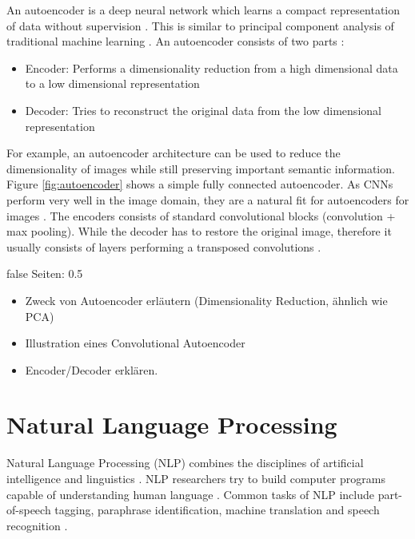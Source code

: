 \documentclass[draft,final,oneside]{vutinfth} %
\begin{document}
An autoencoder is a deep neural network which learns a compact representation of data without supervision \cite{Goodfellow-et-al-2016}. This is similar to principal component analysis of traditional machine learning \cite{bishop}. An autoencoder consists of two parts \cite{Goodfellow-et-al-2016}: 

\begin{itemize}
\item Encoder: Performs a dimensionality reduction from a high dimensional data to a low dimensional representation \cite{Goodfellow-et-al-2016}
\item Decoder: Tries to reconstruct the original data from the low dimensional representation \cite{Goodfellow-et-al-2016}
\end{itemize}

For example, an autoencoder architecture can be used to reduce the dimensionality of images while still preserving important semantic information. Figure \ref{fig:autoencoder} shows a simple fully connected autoencoder. As CNNs perform very well in the image domain, they are a natural fit for autoencoders for images \cite{alexnet}. The encoders consists of standard convolutional blocks (convolution + max pooling). While the decoder has to restore the original image, therefore it usually consists of layers performing a transposed convolutions \cite{dlvc}. 

\if false
Seiten: 0.5
\begin{itemize}
\item Zweck von Autoencoder erläutern (Dimensionality Reduction, ähnlich wie PCA)
\item Illustration eines Convolutional Autoencoder
\item Encoder/Decoder erklären.
\end{itemize}
\fi


\section{Natural Language Processing} \label{nlpbackground}

Natural Language Processing (NLP) combines the disciplines of artificial intelligence and linguistics \cite{statisticalnlp}\cite{speechandlanguageprocessing}. NLP researchers try to build computer programs capable of understanding human language \cite{speechandlanguageprocessing}. Common tasks of NLP include part-of-speech tagging, paraphrase identification, machine translation and speech recognition \cite{surveynlp}\cite{nmt}\cite{googlespeech}\cite{speech}\cite{paraphrase}.
\end{document}
